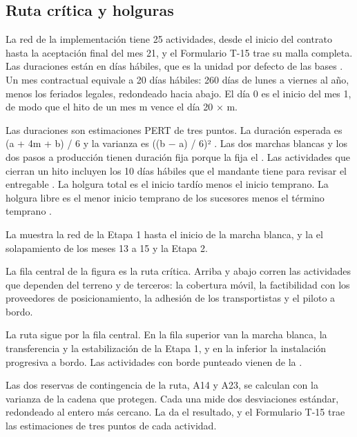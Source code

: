 \subsection{Ruta crítica y holguras}\label{sec:7-ruta}

La red de la implementación tiene 25 actividades, desde el inicio del contrato hasta la aceptación
final del mes 21, y el Formulario T-15 trae su malla completa. Las duraciones están en días hábiles,
que es la unidad por defecto de las bases . Un mes contractual equivale a 20 días
hábiles: 260 días de lunes a viernes al año, menos los feriados legales, redondeado hacia abajo. El
día 0 es el inicio del mes 1, de modo que el hito de un mes m vence el día 20 × m.

Las duraciones son estimaciones PERT de tres puntos. La duración esperada es (a + 4m + b) / 6 y la
varianza es ((b − a) / 6)² \parencite{malcolm1959}. Las dos marchas blancas y los dos pasos a
producción tienen duración fija porque la fija el . Las actividades que cierran un hito
incluyen los 10 días hábiles que el mandante tiene para revisar el entregable . La
holgura total es el inicio tardío menos el inicio temprano. La holgura libre es el menor inicio
temprano de los sucesores menos el término temprano \parencite{pmi2019}.

La  muestra la red de la Etapa 1 hasta el inicio de la marcha blanca, y la
 el solapamiento de los meses 13 a 15 y la Etapa 2.


La fila central de la figura es la ruta crítica. Arriba y abajo corren las actividades que dependen
del terreno y de terceros: la cobertura móvil, la factibilidad con los proveedores de posicionamiento,
la adhesión de los transportistas y el piloto a bordo.


La ruta sigue por la fila central. En la fila superior van la marcha blanca, la transferencia y la
estabilización de la Etapa 1, y en la inferior la instalación progresiva a bordo. Las actividades con
borde punteado vienen de la .

Las dos reservas de contingencia de la ruta, A14 y A23, se calculan con la varianza de la cadena que
protegen. Cada una mide dos desviaciones estándar, redondeado al entero más cercano. La
 da el resultado, y el Formulario T-15 trae las estimaciones de tres puntos de cada
actividad.

